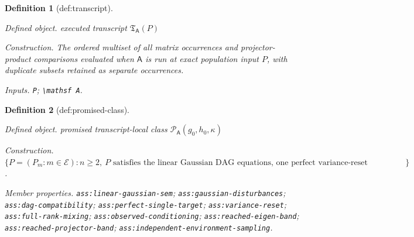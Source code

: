 \documentclass{article}
\newtheorem{definition}{Definition}
\begin{document}
\begin{definition}[def:transcript]\label{def:transcript}
\par\smallskip\noindent\emph{Defined object.} executed transcript \(\mathfrak T_{\mathsf A}(P)\)
\par\smallskip\noindent\emph{Construction.} The ordered multiset of all matrix occurrences and projector-product comparisons evaluated when \(\mathsf A\) is run at exact population input \(P\), with duplicate subsets retained as separate occurrences.
\par\smallskip\noindent\emph{Inputs.} \texttt{P}; \texttt{\textbackslash{}\allowbreak{}mathsf A}.
\end{definition}

\begin{definition}[def:promised-class]\label{def:promised-class}
\par\smallskip\noindent\emph{Defined object.} promised transcript-local class \(\mathcal P_{\mathsf A}(g_0,h_0,\kappa)\)
\par\smallskip\noindent\emph{Construction.} \(\{P=(P_m:m\in\mathcal E): n\ge2,\ P\text{ satisfies the linear Gaussian DAG equations, one perfect variance-reset intervention per target, injective mixing, observed conditioning, reached eigen band, reached projector band, and independent environment sampling}\}\).
\par\smallskip\noindent\emph{Member properties.} \texttt{ass:\allowbreak{}linear-\allowbreak{}gaussian-\allowbreak{}sem}; \texttt{ass:\allowbreak{}gaussian-\allowbreak{}disturbances}; \texttt{ass:\allowbreak{}dag-\allowbreak{}compatibility}; \texttt{ass:\allowbreak{}perfect-\allowbreak{}single-\allowbreak{}target}; \texttt{ass:\allowbreak{}variance-\allowbreak{}reset}; \texttt{ass:\allowbreak{}full-\allowbreak{}rank-\allowbreak{}mixing}; \texttt{ass:\allowbreak{}observed-\allowbreak{}conditioning}; \texttt{ass:\allowbreak{}reached-\allowbreak{}eigen-\allowbreak{}band}; \texttt{ass:\allowbreak{}reached-\allowbreak{}projector-\allowbreak{}band}; \texttt{ass:\allowbreak{}independent-\allowbreak{}environment-\allowbreak{}sampling}.
\end{definition}
\end{document}

